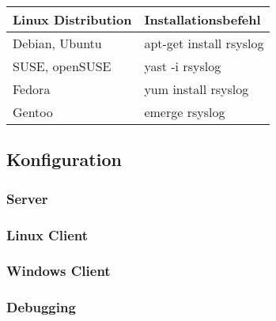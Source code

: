 		\begin{tabular}{ll}
			\hline
			Linux Distribution & Installationsbefehl\\
			\hline\hline
			Debian, Ubuntu & apt-get install rsyslog\\
			SUSE, openSUSE & yast -i rsyslog\\
			Fedora         & yum install rsyslog\\
			Gentoo         & emerge rsyslog
		\end{tabular}


	\subsection{Konfiguration}
		\subsubsection*{Server}
		\subsubsection*{Linux Client}
		\subsubsection*{Windows Client}
		\subsubsection*{Debugging}

